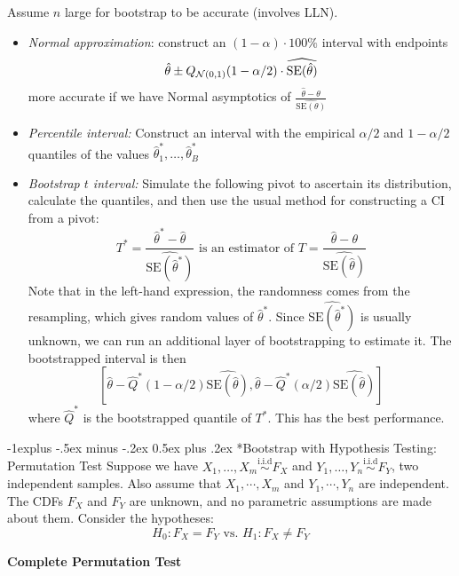 \documentclass[10pt,landscape]{article}
\makeatletter
\renewcommand{\subsection}{\@startsection{subsection}{2}{0mm}%
                                {-1explus -.5ex minus -.2ex}%
                                {0.5ex plus .2ex}%
                                {\normalfont\normalsize\bfseries}}
\makeatother
\begin{document}
\begin{multicols*}{3}
Assume $n$ large for bootstrap to be accurate (involves LLN).
\begin{itemize}
    \item \textit{Normal approximation}: construct an $(1 -\alpha) \cdot 100\%$ interval with endpoints $$\hat\theta \pm Q_{\mathcal{N}(0,1)}(1-\alpha/2)\cdot \widehat{\text{SE} (\hat{\theta})} $$
    more accurate if we have Normal asymptotics of $\frac{\hat{\theta}-\theta}{\widehat{\text{SE}(\theta)}}$
    \item \textit{Percentile interval: } Construct an interval with the empirical $\alpha/2$ and $1-\alpha/2$ quantiles of the values $\hat\theta_1^* , \ldots, \hat\theta_B^*$
    \item \textit{Bootstrap $t$ interval:} Simulate the following pivot to ascertain its distribution, calculate the quantiles, and then use the usual method for constructing a CI from a pivot:
    $$T^*=\frac{\hat{\theta}^* - \hat{\theta}}{\widehat{\text{SE}(\hat{\theta}^*)}} \text{ is an estimator of } T=\frac{\hat{\theta}-\theta}{\widehat{\text{SE}(\hat{\theta})}}$$
    Note that in the left-hand expression, the randomness comes from the resampling,
    which gives random values of $\hat{\theta}^*$. Since $\widehat{\text{SE}(\hat\theta^*)}$ is usually unknown, we can run an additional layer of bootstrapping to estimate it. The bootstrapped interval is then
    $$
    \left[\hat\theta-\hat Q^*(1-\alpha/2)\widehat{\text{SE}(\hat\theta)},\hat\theta-\hat Q^*(\alpha/2)\widehat{\text{SE}(\hat\theta)}\right]
    $$
    where $\hat Q^*$ is the bootstrapped quantile of $T^*$. This has the best performance.
\end{itemize}


\subsection*{Bootstrap with Hypothesis Testing: Permutation Test}
Suppose we have $X_1, \ldots, X_m \stackrel{\text{i.i.d}}{\sim} F_X$ and $Y_1, \ldots, Y_n \stackrel{\text {i.i.d}}{\sim} F_Y$, two independent samples. Also assume that $X_1, \cdots ,X_m$ and $Y_1, \cdots , Y_n$ are independent. The CDFs $F_X$ and $F_Y$ are unknown, and no parametric assumptions are made about them. Consider the hypotheses:
$$
H_0: F_X=F_Y \text { vs. } H_1: F_X \neq F_Y
$$

\textbf{Complete Permutation Test}


\end{multicols*}
\end{document}
